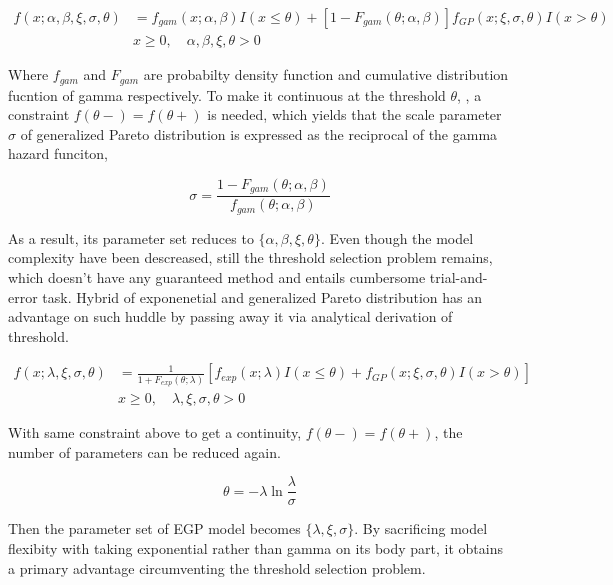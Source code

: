 \documentclass[12pt]{article}\usepackage[]{graphicx}\usepackage[]{color}
\begin{document}
\begin{align}
  \label{eq:gamma_gp_hybrid.pdf}
  f(x ; \alpha, \beta, \xi, \sigma, \theta) &= f_{gam}(x ; \alpha, \beta) I(x \leq \theta) + [1-F_{gam}(\theta ; \alpha, \beta)] f_{GP}(x ; \xi, \sigma, \theta) I(x > \theta) \nonumber \\
    & x \geq 0, \quad \alpha, \beta, \xi, \theta > 0 
\end{align}


Where $f_{gam}$ and $F_{gam}$ are probabilty density function and cumulative distribution fucntion of gamma respectively. To make it continuous at the threshold $\theta$, , a constraint $f(\theta-) = f(\theta+)$ is needed, which yields that the scale parameter $\sigma$ of generalized Pareto distribution is expressed as the reciprocal of the gamma hazard funciton, 


\begin{equation}
  \label{eq:GGP_sigma}
  \sigma = \frac {1 - F_{gam}(\theta ; \alpha, \beta)} {f_{gam}(\theta ; \alpha, \beta)}
\end{equation}


As a result, its parameter set reduces to $\{\alpha, \beta, \xi, \theta\}$. Even though the model complexity have been descreased, still the threshold selection problem remains, which doesn't have any guaranteed method and entails cumbersome trial-and-error task. Hybrid of exponenetial and generalized Pareto distribution \cite{li2012simulation} has an advantage on such huddle by passing away it via analytical derivation of threshold.


\begin{align}
  \label{eq:exponential_gp_hybrid.pdf}
  f(x ; \lambda, \xi, \sigma, \theta) &= \frac {1} {1 + F_{exp}(\theta ; \lambda)} [f_{exp}(x ; \lambda) I(x \leq \theta) + f_{GP}(x ;  \xi, \sigma, \theta) I(x > \theta)] \nonumber \\ 
   & x \geq 0, \quad \lambda, \xi, \sigma, \theta > 0 
\end{align}


With same constraint above to get a continuity, $f(\theta-) = f(\theta+)$, the number of parameters can be reduced again. 


\begin{equation}
  \label{theta_expression}
  \theta = -\lambda \ln{\frac {\lambda} {\sigma}}
\end{equation}


Then the parameter set of EGP model becomes $\{\lambda, \xi, \sigma\}$. By sacrificing model flexibity with taking exponential rather than gamma on its body part, it obtains a primary advantage circumventing the threshold selection problem.
\end{document}
